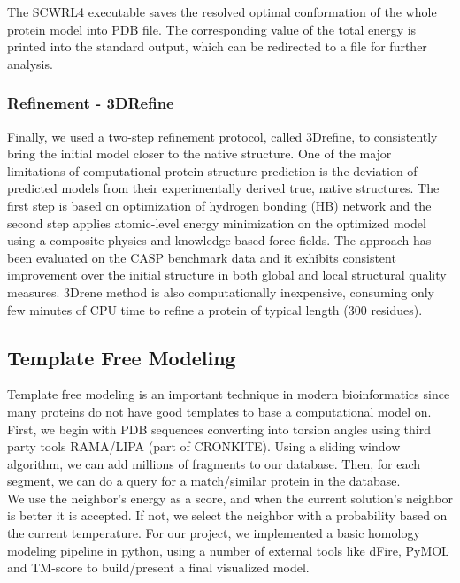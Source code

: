 \documentclass{article}
\begin{document}
The SCWRL4 executable saves the resolved optimal conformation of the whole protein model into PDB file. The corresponding value of the total energy is printed into the standard output, which can be redirected to a file for further analysis.


\subsubsection*{Refinement - 3DRefine}

Finally, we used a two-step refinement protocol, called 3Drefine, to consistently bring the initial model closer to the native structure. One of the major limitations of computational protein structure prediction is the deviation of predicted models from their experimentally derived true, native structures. The first step is based on optimization of hydrogen bonding (HB) network and the second step applies atomic-level energy minimization on the optimized model using a composite physics and knowledge-based force fields. The approach has been evaluated on the CASP benchmark data and it exhibits consistent improvement over the initial structure in both global and local structural quality measures. 3Drene method is also computationally inexpensive, consuming only few minutes of CPU time to refine a protein of typical length (300 residues).


\subsection{Template Free Modeling}

Template free modeling is an important technique in modern bioinformatics since many proteins do not have good templates to base a computational model on. First, we begin with PDB sequences converting into torsion angles using third party tools RAMA/LIPA (part of CRONKITE). Using a sliding window algorithm, we can add millions of fragments to our database. Then, for each segment, we can do a query for a match/similar protein in the database.\\

We use the neighbor's energy as a score, and when the current solution’s neighbor is better it is accepted. If not, we select the neighbor with a probability based on the current temperature. For our project, we implemented a basic homology modeling pipeline in python, using a number of external tools like dFire, PyMOL and TM-score to build/present a final visualized model.\\
\end{document}
